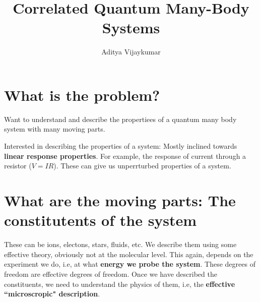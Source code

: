\documentclass[a4paper,11pt]{article}
\title{\textbf{Correlated Quantum Many-Body Systems}}
\author{Aditya Vijaykumar}
\affiliation{International Centre for Theoretical Sciences, Bengaluru, India.}
\begin{document}
\maketitle

\section{What is the problem?}
Want to understand and describe the propertiees of a quantum many body system with many moving parts. 

Interested in describing the properties of a system: Mostly inclined towards {\bf linear response properties}. For example, the response of current through a resistor ($V = I R$). These can give us unperrturbed properties of a system.

\section{What are the moving parts: The constitutents of the system}
These can be ions, electons, stars, fluids, etc. We describe them using some effective theory, obviously not at the molecular level. This again, depends on the experiment we do, i.e, at what {\bf energy we probe the system}. These degrees of freedom are effective degrees of freedom. Once we have described the constituents, we need to understand the physics of them, i.e, the {\bf effective ``microscropic" description}. 
\end{document}
